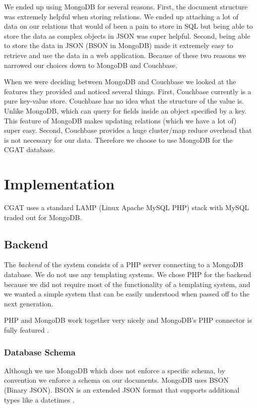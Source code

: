 \documentclass[10pt, conference, compsocconf]{IEEEtran}
\begin{document}
We ended up using MongoDB for several reasons. First, the document structure was extremely helpful when storing
relations. We ended up attaching a lot of data on our relations that would of been a pain to store in SQL but being
able to store the data as complex objects in JSON was super helpful. Second, being able to store the data in JSON
(BSON in MongoDB) made it extremely easy to retrieve and use the data in a web application. Because of these two reasons
we narrowed our choices down to MongoDB and Couchbase. 

When we were deciding between MongoDB and Couchbase we looked at the features they 
provided and noticed several things. First, Couchbase currently is a pure key-value store. Couchbase has
no idea what the structure of the value is. Unlike MongoDB, which can query for fields inside an 
object specified by a key. This feature of MongoDB makes updating relations (which we 
have a lot of) super easy. Second, Couchbase provides a huge
cluster/map reduce overhead that is not necessary for our data. Therefore we choose to use
MongoDB for the CGAT database.

\section{Implementation}\label{sec:implementation}
CGAT uses a standard LAMP (Linux Apache MySQL PHP) stack with MySQL traded out for MongoDB.

\subsection{Backend}
The \textit{backend} of the system consists of a PHP server connecting to a MongoDB database.
We do not use any templating systems.
We chose PHP for the backend because we did not require most of the functionality of a templating system, and we wanted a simple
system that can be easily understood when passed off to the next generation.

PHP and MongoDB work together very nicely and MongoDB's PHP connector is fully featured \cite{phpMongo}.

\subsubsection{Database Schema}
Although we use MongoDB which does not enforce a specific schema, by convention we enforce a schema on our documents.
MongoDB uses BSON (Binary JSON). BSON is an extended JSON format that supports additional types like a datetimes \cite{bson}.
\end{document}
